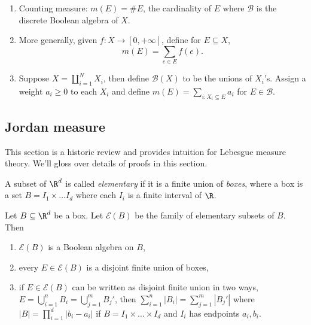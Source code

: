 \documentclass[a4paper]{article}
\begin{document}
\begin{eg}\leavevmode
  \begin{enumerate}
  \item Counting measure: \(m(E) = \#E\), the cardinality of \(E\) where \(\mathcal B\) is the discrete Boolean algebra of \(X\).
  \item More generally, given \(f: X \to [0, +\infty]\), define for \(E \subseteq X\),
    \[
      m(E) = \sum_{e \in E} f(e).
    \]
  \item Suppose \(X = \coprod_{i = 1}^N X_i\), then define \(\mathcal B(X)\) to be the unions of \(X_i\)'s. Assign a weight \(a_i \geq 0\) to each \(X_i\) and define \(m(E) = \sum_{i: X_i \subseteq E} a_i\) for \(E \in \mathcal B\).
  \end{enumerate}
\end{eg}

\subsection{Jordan measure}

This section is a historic review and provides intuition for Lebesgue measure theory. We'll gloss over details of proofs in this section.

\begin{definition}
  A subset of \(\R^d\) is called \emph{elementary} if it is a finite union of \emph{boxes}, where a box is a set \(B = I_1 \times \dots I_d\) where each \(I_i\) is a finite interval of \(\R\).
\end{definition}

\begin{proposition}
  Let \(B \subseteq \R^d\) be a box. Let \(\mathcal E(B)\) be the family of elementary subsets of \(B\). Then
  \begin{enumerate}
  \item \(\mathcal E(B)\) is a Boolean algebra on \(B\),
  \item every \(E \in \mathcal E(B)\) is a disjoint finite union of boxes,
  \item if \(E \in \mathcal E(B)\) can be written as disjoint finite union in two ways, \(E = \bigcup_{i = 1}^n B_i = \bigcup_{j = 1}^m B_j'\), then \(\sum_{i = 1}^n |B_i| = \sum_{j = 1}^m |B_j'|\) where \(|B| = \prod_{i = 1}^d |b_i - a_i|\) if \(B = I_1 \times \dots \times I_d\) and \(I_i\) has endpoints \(a_i, b_i\).
  \end{enumerate}
\end{proposition}
\end{document}
